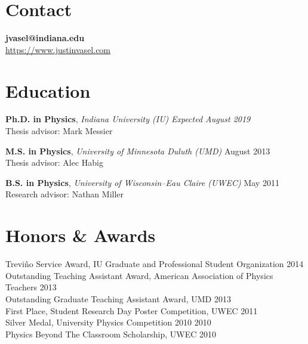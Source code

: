 \documentclass[11pt]{cv}
\begin{document}

\begin{cv}


\section{Contact}
\textbf{jvasel@indiana.edu} \\
\href{https://www.justinvasel.com}{https://www.justinvasel.com}


\section{Education}

\textbf{Ph.D. in Physics}, \emph{Indiana University (IU)} \hfill \emph{Expected August 2019} \\
Thesis advisor: Mark Messier

\textbf{M.S. in Physics}, \emph{University of Minnesota Duluth (UMD)} \hfill August 2013 \\
Thesis advisor: Alec Habig

\textbf{B.S. in Physics}, \emph{University of Wisconsin--Eau Claire (UWEC)} \hfill May 2011 \\
Research advisor: Nathan Miller


\section{Honors \& Awards}

Trevi\~{n}o Service Award, IU Graduate and Professional Student Organization \hfill 2014 \\
Outstanding Teaching Assistant Award, American Association of Physics Teachers \hfill 2013 \\
Outstanding Graduate Teaching Assistant Award, UMD \hfill 2013 \\
First Place, Student Research Day Poster Competition, UWEC \hfill 2011 \\
Silver Medal, University Physics Competition 2010 \hfill 2010 \\
Physics Beyond The Classroom Scholarship, UWEC \hfill 2010



\end{cv}
\end{document}
